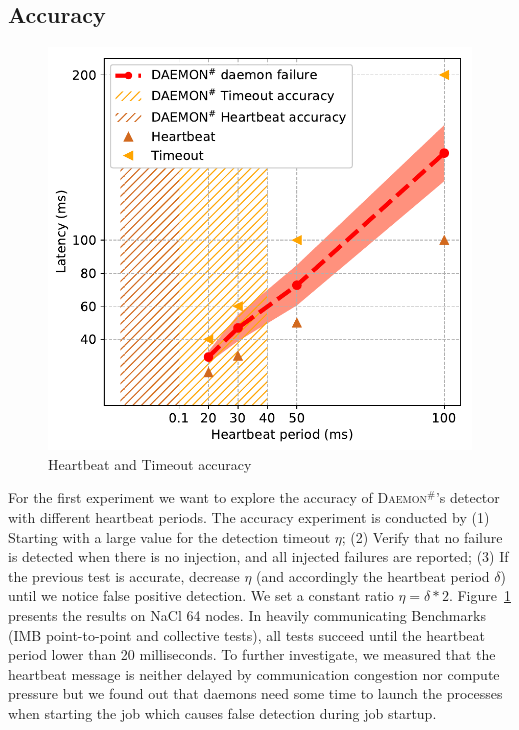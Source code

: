 \documentclass[sigconf]{acmart}
\newcommand{\ourwork}[0]{\textsc{Daemon}\ensuremath{^\#}\xspace}
\newcommand{\imb}[0]{\textsc{IMB}\xspace}
\begin{document}
\subsection{Accuracy}
\begin{figure}[h]
  \centering
  \includegraphics[width=\linewidth]{accuracy.pdf}
  \caption{Heartbeat and Timeout accuracy}
  \label{fig:accuracy}
\end{figure}

For the first experiment we want to explore the accuracy of \ourwork's detector with different heartbeat periods. 
%
The accuracy experiment is conducted by (1) Starting with a large value for the 
detection timeout $\eta$; (2) Verify that no failure is detected when there is no injection, and all injected failures are reported; (3) If the previous test is accurate, decrease $\eta$ (and accordingly the heartbeat period $\delta$) until we notice false positive detection. We set a constant ratio $\eta = \delta * 2$.
 Figure~\ref{fig:accuracy} presents the results on NaCl 64 nodes.
 In heavily communicating Benchmarks
 (\imb point-to-point and collective tests), all tests succeed until the 
  heartbeat period lower than 20 milliseconds. To further investigate,
  we measured that the heartbeat message is neither delayed by communication
  congestion nor compute pressure but we found out that daemons need some time to launch the processes when starting the job which causes false detection during job startup. 
  
\end{document}
